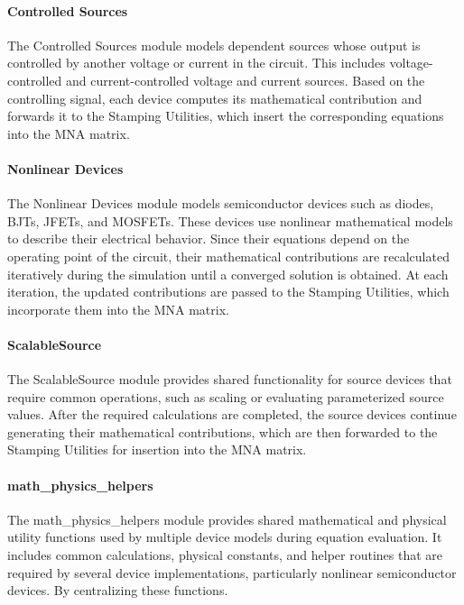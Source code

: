 \paragraph{Controlled Sources}
The Controlled Sources module models dependent sources whose output is controlled by another voltage or current in the circuit. This includes voltage-controlled and current-controlled voltage and current sources. Based on the controlling signal, each device computes its mathematical contribution and forwards it to the Stamping Utilities, which insert the corresponding equations into the MNA matrix.
\paragraph{Nonlinear Devices}
The Nonlinear Devices module models semiconductor devices such as diodes, BJTs, JFETs, and MOSFETs. These devices use nonlinear mathematical models to describe their electrical behavior. Since their equations depend on the operating point of the circuit, their mathematical contributions are recalculated iteratively during the simulation until a converged solution is obtained. At each iteration, the updated contributions are passed to the Stamping Utilities, which incorporate them into the MNA matrix.
\paragraph{ScalableSource}
The ScalableSource module provides shared functionality for source devices that require common operations, such as scaling or evaluating parameterized source values. After the required calculations are completed, the source devices continue generating their mathematical contributions, which are then forwarded to the Stamping Utilities for insertion into the MNA matrix.
\paragraph{math\_physics\_helpers}
The math\_physics\_helpers module provides shared mathematical and physical utility functions used by multiple device models during equation evaluation. It includes common calculations, physical constants, and helper routines that are required by several device implementations, particularly nonlinear semiconductor devices. By centralizing these functions.
